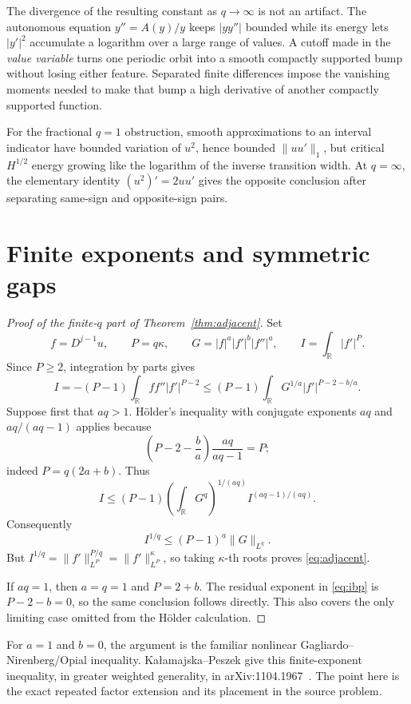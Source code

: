 \documentclass[11pt]{article}
\newcommand{\R}{\mathbb R}
\begin{document}
The divergence of the resulting constant as $q\to\infty$ is not an artifact.
The autonomous equation $y''=A(y)/y$ keeps $|yy''|$ bounded while its energy
lets $|y'|^2$ accumulate a logarithm over a large range of values.  A cutoff
made in the \emph{value variable} turns one periodic orbit into a smooth
compactly supported bump without losing either feature.  Separated finite
differences impose the vanishing moments needed to make that bump a high
derivative of another compactly supported function.

For the fractional $q=1$ obstruction, smooth approximations to an interval
indicator have bounded variation of $u^2$, hence bounded $\|uu'\|_1$, but
critical $H^{1/2}$ energy growing like the logarithm of the inverse transition
width.  At $q=\infty$, the elementary identity $(u^2)'=2uu'$ gives the
opposite conclusion after separating same-sign and opposite-sign pairs.

\section{Finite exponents and symmetric gaps}

\begin{proof}[Proof of the finite-$q$ part of Theorem~\ref{thm:adjacent}]
Set
\[
 f=D^{j-1}u,\qquad P=q\kappa,\qquad
 G=|f|^a|f'|^b|f''|^a,
 \qquad I=\int_\R |f'|^P.
\]
Since $P\ge2$, integration by parts gives
\begin{equation}\label{eq:ibp}
 I=-(P-1)\int_\R f f''|f'|^{P-2}
 \le(P-1)\int_\R G^{1/a}|f'|^{P-2-b/a}.
\end{equation}
Suppose first that $aq>1$.  H\"older's inequality with conjugate exponents
$aq$ and $aq/(aq-1)$ applies because
\begin{equation}\label{eq:holder-id}
 \left(P-2-\frac ba\right)\frac{aq}{aq-1}=P;
\end{equation}
indeed $P=q(2a+b)$.  Thus
\[
 I\le(P-1)
 \left(\int_\R G^q\right)^{1/(aq)} I^{(aq-1)/(aq)}.
\]
Consequently
\[
 I^{1/q}\le(P-1)^a\|G\|_{L^q}.
\]
But $I^{1/q}=\|f'\|_{L^P}^{P/q}=\|f'\|_{L^P}^{\kappa}$, so taking
$\kappa$-th roots proves \eqref{eq:adjacent}.

If $aq=1$, then $a=q=1$ and $P=2+b$.  The residual exponent in
\eqref{eq:ibp} is $P-2-b=0$, so the same conclusion follows directly.  This
also covers the only limiting case omitted from the H\"older calculation.
\end{proof}

For $a=1$ and $b=0$, the argument is the familiar nonlinear
Gagliardo--Nirenberg/Opial inequality.  Ka{\l}amajska--Peszek give this
finite-exponent inequality, in greater weighted generality, in
arXiv:1104.1967~\cite{KalamajskaPeszek}.  The point here is the exact repeated
factor extension and its placement in the source problem.
\end{document}
